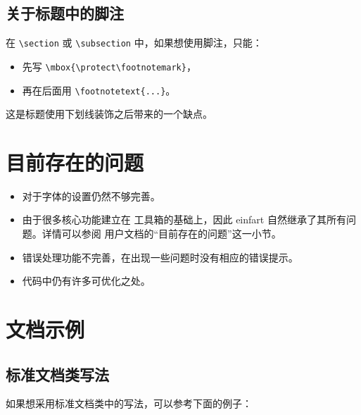 \documentclass[puretext]{einfart}
\providecommand{\einfart}{\textsf{einfart}}
\begin{document}
\subsection{关于标题中的脚注}
在 \lstinline|\section| 或 \lstinline|\subsection| 中，如果想使用脚注，只能：
\begin{itemize}
    \item 先写 \lstinline|\mbox{\protect\footnotemark}|，
    \item 再在后面用 \lstinline|\footnotetext{...}|。
\end{itemize}
这是标题使用下划线装饰之后带来的一个缺点。


\section{目前存在的问题}

\begin{itemize}[itemsep=.6em]
    \item 对于字体的设置仍然不够完善。
    \item 由于很多核心功能建立在 \ProjLib{} 工具箱的基础上，因此 \einfart{} 自然继承了其所有问题。详情可以参阅 \ProjLib{} 用户文档的“目前存在的问题”这一小节。
    \item 错误处理功能不完善，在出现一些问题时没有相应的错误提示。
    \item 代码中仍有许多可优化之处。
\end{itemize}




\clearpage
\section{文档示例}

\subsection{标准文档类写法}

如果想采用标准文档类中的写法，可以参考下面的例子：
\end{document}
